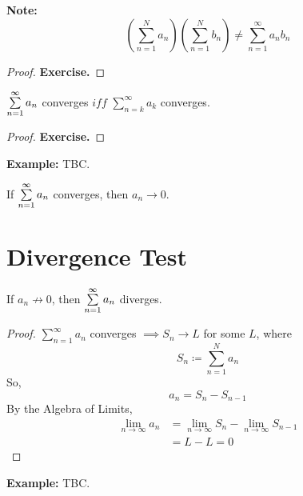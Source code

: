 \documentclass[openany]{report}
\begin{document}
\begin{center}
    \textbf{Note:}
    \[\left(\sum_{n=1}^N a_n\right) \left(\sum_{n=1}^N b_n\right) \neq \sum_{n=1}^\infty a_nb_n\]
\end{center}

\begin{proof}
    \textbf{Exercise.}
\end{proof}

\begin{prop}
    \begin{center}
        $\sum\limits_{n=1}^\infty a_n$ converges $iff$ $\sum_{n=k}^\infty a_k$ converges.
    \end{center}
\end{prop}
\begin{proof}
    \textbf{Exercise.}
\end{proof}

\textbf{Example:} TBC.

\begin{prop}
    If $\sum\limits_{n=1}^\infty a_n$ converges, then $a_n \rightarrow 0$.
\end{prop}


\section{Divergence Test}

\begin{prop}
    If $a_n\not\rightarrow 0$, then $\sum\limits_{n=1}^\infty a_n$ diverges.
\end{prop}
\begin{proof}
    $\sum_{n=1}^\infty a_n$ converges $\implies S_n \rightarrow L$ for some $L$, where 
    \[S_n \coloneqq \sum_{n=1}^N a_n\]
    So, 
    \[a_n = S_n - S_{n-1}\]
    By the Algebra of Limits, 
    \begin{align*}
        \lim_{n\rightarrow \infty} a_n &= \lim_{n\rightarrow \infty} S_n - \lim_{n\rightarrow \infty} S_{n-1}\\
        &= L - L = 0
    \end{align*}
\end{proof}
\textbf{Example:} TBC.
\end{document}
